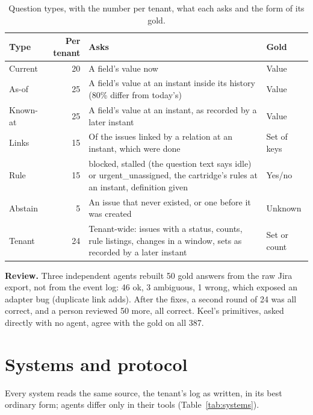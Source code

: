 \documentclass{article}
\begin{document}
\begin{table}[t]
\caption{Question types, with the number per tenant, what each asks and the form of its gold.}
\label{tab:questions}
\centering
\small
\begin{tabularx}{\textwidth}{l r L P{0.85in}}
\toprule
Type & Per tenant & Asks & Gold \\
\midrule
Current & 20 & A field's value now & Value \\
As-of & 25 & A field's value at an instant inside its history (80\% differ from today's) & Value \\
Known-at & 25 & A field's value at an instant, as recorded by a later instant & Value \\
Links & 15 & Of the issues linked by a relation at an instant, which were done & Set of keys \\
Rule & 15 & blocked, stalled (the question text says idle) or urgent\_unassigned, the cartridge's rules at an instant, definition given & Yes/no \\
Abstain & 5 & An issue that never existed, or one before it was created & Unknown \\
Tenant & 24 & Tenant-wide: issues with a status, counts, rule listings, changes in a window, sets as recorded by a later instant & Set or count \\
\bottomrule
\end{tabularx}
\end{table}

\textbf{Review.} Three independent agents rebuilt 50 gold answers from the raw Jira export, not from the event log: 46 ok, 3 ambiguous, 1 wrong, which exposed an adapter bug (duplicate link adds). After the fixes, a second round of 24 was all correct, and a person reviewed 50 more, all correct. Keel's primitives, asked directly with no agent, agree with the gold on all 387.

\section{Systems and protocol}
\label{sec:systems}

Every system reads the same source, the tenant's log as written, in its best ordinary form; agents differ only in their tools (Table~\ref{tab:systems}).
\end{document}
